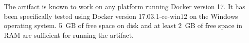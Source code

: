 \documentclass[a4paper,UKenglish]{darts}
\begin{document}
\begin{platforms}
  The artifact is known to work on any platform running Docker version 17. It has been 
  specifically tested using Docker version 17.03.1-ce-win12 on the Windows operating system.
  5~GB of free space on disk and at least 2~GB of free space in RAM are sufficient for running
  the artifact.
\end{platforms}











%

\end{document}
